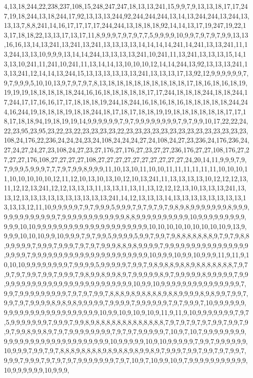 4,13,18,244,22,238,237,108,15,248,247,247,18,13,13,241,15,9,9,7,9,13,13,18,17,17,247,19,18,244,13,18,244,17,92,13,13,13,244,92,244,244,244,13,14,13,244,244,13,244,13,13,13,7,8,8,241,14,16,17,17,17,17,244,244,13,18,18,18,92,14,14,13,17,19,247,19,22,13,17,18,18,22,13,13,17,13,17,11,8,9,9,9,7,9,7,9,7,7,5,9,9,9,9,10,9,9,7,9,7,9,7,9,9,13,13,16,16,13,14,13,241,13,241,13,241,13,13,13,13,14,14,14,14,241,14,241,13,13,241,11,13,244,13,13,10,9,9,9,13,14,14,244,13,13,13,13,241,10,241,11,13,241,13,13,13,15,14,13,13,10,241,11,241,10,241,11,13,14,14,13,10,10,10,12,14,14,244,13,92,13,13,13,241,13,13,241,12,14,14,13,244,15,13,13,13,13,13,13,241,13,13,13,17,13,92,12,9,9,9,9,9,9,7,9,7,9,9,9,5,10,10,13,9,7,9,7,9,7,8,13,18,18,18,18,18,18,18,18,18,17,18,16,18,16,18,19,19,19,19,18,18,18,18,18,244,16,16,18,18,18,18,18,17,17,244,18,18,18,244,18,18,244,17,244,17,17,16,16,17,17,18,18,18,19,244,18,244,16,18,16,18,16,18,18,18,18,18,244,244,16,244,19,18,18,18,19,18,18,244,18,17,18,17,18,18,19,19,18,18,18,18,18,18,17,17,18,17,18,18,94,19,18,19,19,14,9,9,9,9,9,9,7,9,7,9,9,9,9,9,9,9,9,7,9,7,9,9,10,17,22,22,24,22,23,95,23,95,23,22,23,22,23,23,23,23,22,23,23,23,23,23,23,23,23,23,23,23,23,23,23,108,24,176,22,236,24,24,24,23,24,108,24,24,24,27,24,108,24,27,23,236,24,176,236,24,27,24,27,24,27,23,108,24,27,23,27,176,27,176,27,23,27,27,236,176,27,27,108,176,27,27,27,27,176,108,27,27,27,27,108,27,27,27,27,27,27,27,27,27,27,24,20,14,11,9,9,9,7,9,7,9,9,9,5,9,9,9,7,7,7,9,7,9,9,8,9,9,9,11,10,13,10,11,10,10,11,11,11,11,11,11,10,10,10,11,10,10,10,10,10,12,11,12,10,13,10,13,10,12,10,13,241,11,13,13,13,13,10,12,12,12,13,11,12,12,13,241,12,12,13,13,13,11,13,13,11,13,11,13,12,12,12,13,10,13,13,13,241,13,13,12,13,13,13,13,13,13,13,13,13,13,241,14,12,13,13,13,14,13,13,13,13,13,13,13,13,13,13,13,12,11,10,9,9,9,9,9,7,9,7,9,9,9,5,9,9,9,7,9,7,9,7,9,7,9,8,9,8,9,9,9,9,9,9,9,8,9,9,9,9,9,9,9,9,9,9,9,9,9,7,9,9,9,9,9,9,9,9,9,9,9,9,8,8,9,9,9,9,9,9,9,9,9,9,10,9,9,9,9,9,9,9,9,9,9,9,9,10,10,9,9,9,9,9,9,9,9,9,9,9,9,9,9,9,9,9,9,9,9,9,10,10,10,10,10,10,10,10,10,9,13,9,9,9,9,10,10,10,9,9,10,9,9,9,7,9,7,9,9,5,9,9,9,9,5,9,9,7,9,9,7,9,8,8,8,8,8,8,8,9,7,9,7,9,8,8,9,9,9,9,9,7,9,9,9,7,9,9,9,7,9,7,9,7,9,9,9,8,8,9,8,9,9,9,9,7,9,9,9,9,9,9,9,9,9,9,9,9,9,9,9,9,9,9,9,9,7,9,9,9,9,9,9,9,9,9,9,9,9,9,9,9,9,9,9,9,9,9,9,10,9,9,9,10,9,9,10,9,9,9,11,9,11,9,10,10,10,9,9,9,9,9,9,9,9,7,9,9,9,9,5,9,9,9,9,9,7,9,9,7,9,8,9,8,8,9,8,8,9,8,8,8,8,8,8,8,7,9,7,9,7,9,7,9,9,7,9,9,7,9,9,9,7,9,8,9,9,8,9,9,8,9,7,9,9,9,9,9,8,9,7,9,9,9,9,9,8,9,9,9,9,9,7,9,9,9,9,9,9,9,9,9,9,9,9,9,9,9,9,9,9,9,9,9,9,9,9,9,9,10,9,9,10,9,9,9,9,9,9,9,9,9,9,9,9,9,9,9,7,9,9,7,9,9,9,9,9,9,9,9,9,7,9,7,9,7,9,9,7,8,8,8,9,8,9,8,8,8,8,9,8,8,9,9,9,9,8,9,8,9,9,7,9,9,7,9,9,7,9,7,9,9,9,9,8,9,8,9,8,9,9,9,9,9,7,9,9,9,9,7,9,9,9,9,9,9,7,9,7,9,9,9,7,10,9,9,9,9,9,9,9,9,9,9,9,9,9,9,9,9,9,9,9,9,9,9,9,9,10,9,9,10,9,10,9,10,9,11,9,11,9,10,9,9,9,9,9,9,9,7,9,7,5,9,9,9,9,9,9,9,7,9,9,9,7,9,9,8,9,8,8,8,8,8,8,8,8,8,8,8,8,8,7,9,7,9,7,9,7,9,7,9,9,7,9,9,7,9,9,7,9,9,8,9,9,8,9,7,9,7,9,9,9,9,9,9,9,9,7,9,7,9,7,9,9,9,9,9,7,10,9,7,10,7,9,9,9,9,9,9,9,9,9,9,9,9,9,9,9,9,9,9,9,9,9,9,9,9,9,9,9,9,10,9,9,9,9,9,10,9,10,9,9,9,9,9,7,9,9,7,9,9,9,9,9,9,10,9,9,9,7,9,9,7,9,7,8,8,8,9,8,8,8,8,9,8,9,8,8,9,8,9,9,8,9,7,9,9,9,7,9,9,7,9,9,7,9,7,9,9,7,9,9,9,7,9,9,9,7,9,7,9,7,9,7,9,9,9,9,9,9,9,7,9,7,10,9,7,10,9,9,10,9,7,9,9,9,9,9,9,9,9,9,9,9,10,9,9,9,9,9,9,10,9,9,9,